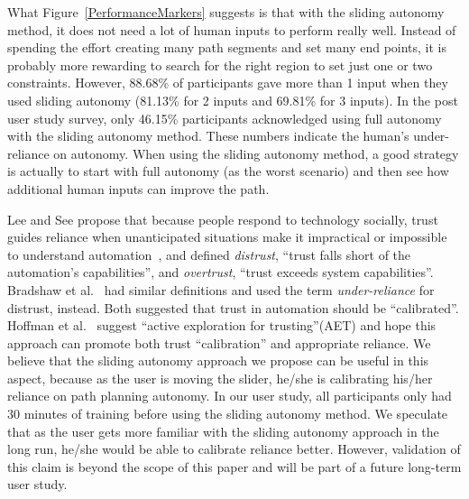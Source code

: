 \documentclass[lettersize, apacite, twoside, HRI]{apa_HRI}
\begin{document}
What Figure~\ref{PerformanceMarkers} suggests is that with the sliding autonomy method, it does not need a lot of human inputs to perform really well. Instead of spending the effort creating many path segments and set many end points, it is probably more rewarding to search for the right region to set just one or two constraints. However, 88.68\% of participants gave more than 1 input when they used sliding autonomy (81.13\% for 2 inputs and 69.81\% for 3 inputs). In the post user study survey, only 46.15\% participants acknowledged using full autonomy with the sliding autonomy method. These numbers indicate the human's under-reliance on autonomy. When using the sliding autonomy method, a good strategy is actually to start with full autonomy (as the worst scenario) and then see how additional human inputs can improve the path.


Lee and See propose that because people respond to technology socially, trust guides reliance when unanticipated situations make it impractical or impossible to understand automation~\cite{Lee2004Trust}, and defined \textit{distrust}, ``trust falls short of the automation's capabilities'', and \textit{overtrust}, ``trust exceeds system capabilities''. Bradshaw et al.\ \cite{Bradshaw2013Seven} had similar definitions and used the term \textit{under-reliance} for distrust, instead. Both suggested that trust in automation should be ``calibrated''. Hoffman et al.\ \cite{Hoffman2013Trust} suggest ``active exploration for trusting''(AET) and hope this approach can promote both trust ``calibration'' and appropriate reliance. We believe that the sliding autonomy approach we propose can be useful in this aspect, because as the user is moving the slider, he/she is calibrating his/her reliance on path planning autonomy. In our user study, all participants only had 30 minutes of training before using the sliding autonomy method. We speculate that as the user gets more familiar with the sliding autonomy approach in the long run, he/she would be able to calibrate reliance better. However, validation of this claim is beyond the scope of this paper and will be part of a future long-term user study.
\end{document}
